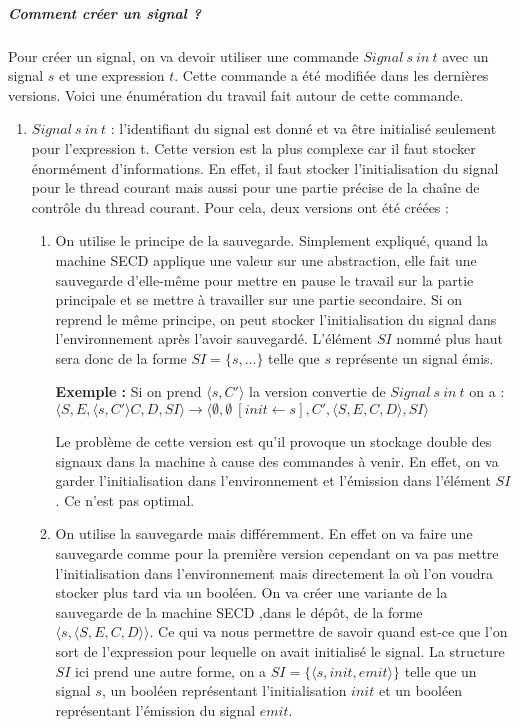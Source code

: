 \documentclass[10pt,a4paper]{article}
\begin{document}
					\subparagraph{Comment créer un signal ?}
					Pour créer un signal, on va devoir utiliser une commande $Signal~s~in~t$ avec un signal $s$ et une expression $t$. Cette commande a été modifiée dans les dernières versions. Voici une énumération du travail fait autour de cette commande.
					\smallbreak
					\begin{enumerate}
						\item $Signal~s~in~t$ : l'identifiant du signal est donné et va être initialisé seulement pour l'expression t. Cette version est la plus complexe car il faut stocker énormément d'informations. En effet, il faut stocker l'initialisation du signal pour le thread courant mais aussi pour une partie précise de la chaîne de contrôle du thread courant. Pour cela, deux versions ont été créées :
						\begin{enumerate}
							\item On utilise le principe de la sauvegarde. Simplement expliqué, quand la machine SECD applique une valeur sur une abstraction, elle fait une sauvegarde d'elle-même pour mettre en pause le travail sur la partie principale et se mettre à travailler sur une partie secondaire. Si on reprend le même principe, on peut stocker l'initialisation du signal dans l'environnement après l'avoir sauvegardé. L'élément $SI$ nommé plus haut sera donc de la forme $SI=\{s,...\}$ telle que $s$ représente un signal émis.
							\medbreak
								
							\textbf{Exemple :} Si on prend $\langle s,C'\rangle$ la version convertie de $Signal~s~in~t$ on a : 
							\\$\langle S,E,\langle s,C'\rangle C,D,SI\rangle \longrightarrow \langle \emptyset,\emptyset~[init \leftarrow s],C',\langle S,E,C,D\rangle,SI\rangle$  
							\medbreak
								
							Le problème de cette version est qu'il provoque un stockage double des signaux dans la machine à cause des commandes à venir. En effet, on va garder l'initialisation dans l'environnement et l'émission dans l'élément $SI$. Ce n'est pas optimal.
								
							\item On utilise la sauvegarde mais différemment. En effet on va faire une sauvegarde comme pour la première version cependant on va pas mettre l'initialisation dans l'environnement mais directement la où l'on voudra stocker plus tard via un booléen. On va créer une variante de la sauvegarde de la machine SECD ,dans le dépôt, de la forme $\langle s,\langle S,E,C,D\rangle\rangle$. Ce qui va nous permettre de savoir quand est-ce que l'on sort de l'expression pour lequelle on avait initialisé le signal. La structure $SI$ ici prend une autre forme, on a $SI=\{\langle s,init,emit\rangle\}$ telle que un signal $s$, un booléen représentant l'initialisation $init$  et un booléen représentant l'émission du signal $emit$.
							\medbreak
								

\end{enumerate}
\end{enumerate}
\end{document}
